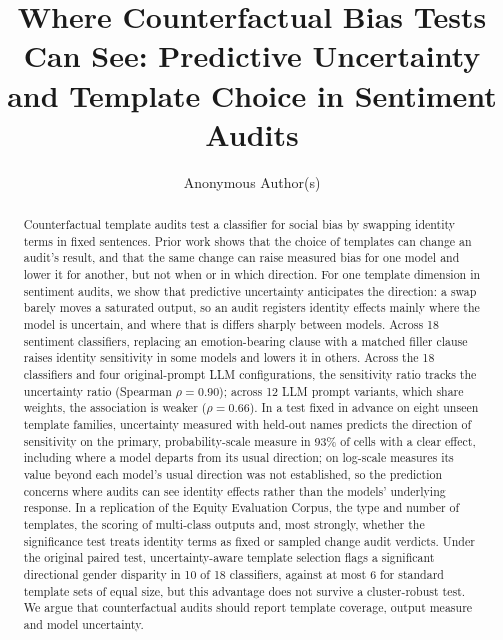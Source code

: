 \documentclass[runningheads]{llncs}
\title{Where Counterfactual Bias Tests Can See: Predictive Uncertainty and
Template Choice in Sentiment Audits}
\author{Anonymous Author(s)}
\institute{Anonymous Institution}
\begin{document}
\maketitle

\begin{abstract}
Counterfactual template audits test a classifier for social bias by swapping
identity terms in fixed sentences. Prior work shows that the choice of templates
can change an audit's result, and that the same change can raise measured bias
for one model and lower it for another, but not when or in which direction. For
one template dimension in sentiment audits, we show that predictive uncertainty
anticipates the direction: a swap barely moves a saturated output, so an audit
registers identity effects mainly where the model is uncertain, and where that
is differs sharply between models. Across 18 sentiment classifiers, replacing an
emotion-bearing clause with a matched filler clause raises identity sensitivity
in some models and lowers it in others. Across the 18 classifiers and four
original-prompt LLM configurations, the sensitivity ratio tracks the uncertainty
ratio (Spearman $\rho{=}0.90$); across 12 LLM prompt variants, which share
weights, the association is weaker ($\rho{=}0.66$). In a test fixed in advance
on eight unseen template families, uncertainty measured with held-out names
predicts the direction of sensitivity on the primary, probability-scale measure
in 93\% of cells with a clear effect, including where a model departs from its
usual direction; on log-scale measures its value beyond each model's usual
direction was not established, so the prediction concerns where audits can see identity effects rather than the
models' underlying response. In a replication of the Equity Evaluation Corpus,
the type and number of templates, the scoring of multi-class outputs and, most
strongly, whether the significance test treats identity terms as fixed or
sampled change audit verdicts. Under the original paired test, uncertainty-aware
template selection flags a significant directional gender disparity in 10 of 18
classifiers, against at most 6 for standard template sets of equal size, but
this advantage does not survive a cluster-robust test. We argue that
counterfactual audits should report template coverage, output measure and model
uncertainty.

\end{abstract}
\end{document}
